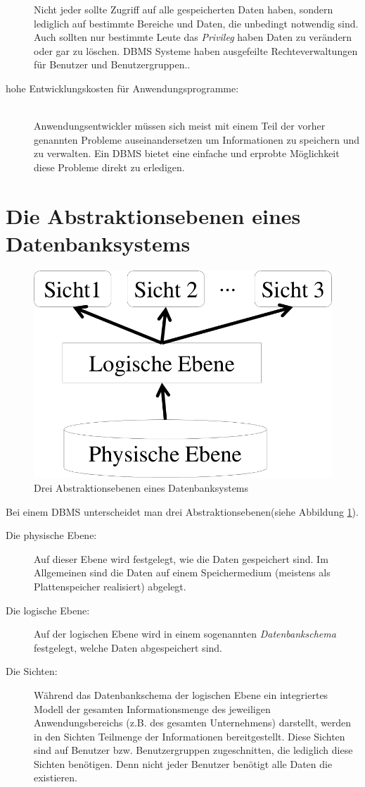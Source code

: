 \begin{description}
  	Nicht jeder sollte Zugriff auf alle gespeicherten Daten haben, sondern lediglich auf bestimmte Bereiche und Daten, die unbedingt notwendig sind. Auch sollten nur bestimmte Leute das \textit{Privileg} haben Daten zu verändern oder gar zu löschen. DBMS Systeme haben ausgefeilte Rechteverwaltungen für Benutzer und Benutzergruppen.. 
  \item[hohe Entwicklungskosten für Anwendungsprogramme:] \hfill \\
  	Anwendungsentwickler müssen sich meist mit einem Teil der vorher genannten Probleme auseinandersetzen um Informationen zu speichern und zu verwalten. Ein DBMS bietet eine einfache und erprobte Möglichkeit diese Probleme direkt zu erledigen.
\end{description}

\section{Die Abstraktionsebenen eines Datenbanksystems}
\begin{figure}[h!]
\centering
\includegraphics[width=0.45\linewidth]{./mainmatter/pics/sichten}
\caption[Abstraktionsebenen]{Drei Abstraktionsebenen eines Datenbanksystems}
\label{fig:sichten}
\end{figure}
Bei einem DBMS unterscheidet man drei Abstraktionsebenen(siehe Abbildung \ref{fig:sichten}).
\begin{description}
\item[Die physische Ebene:] Auf dieser Ebene wird festgelegt, wie die Daten gespeichert sind. Im Allgemeinen sind die Daten auf einem Speichermedium (meistens als Plattenspeicher realisiert) abgelegt. 
\item[Die logische Ebene:] Auf der logischen Ebene wird in einem sogenannten \textit{Datenbankschema} festgelegt, welche Daten abgespeichert sind. 
\item[Die Sichten:] Während das Datenbankschema der logischen Ebene ein integriertes Modell der gesamten Informationsmenge des jeweiligen Anwendungsbereichs (z.B. des gesamten Unternehmens) darstellt, werden in den Sichten Teilmenge der Informationen bereitgestellt. Diese Sichten sind auf Benutzer bzw. Benutzergruppen zugeschnitten, die lediglich diese Sichten benötigen. Denn nicht jeder Benutzer benötigt alle Daten die existieren.
\end{description}

